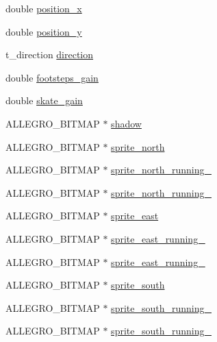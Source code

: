 \begin{DoxyCompactItemize}
\item 
double \hyperlink{classc__character_a09bb0a2dd9eb4a0c7e791706fe51bddc}{position\-\_\-x}
\item 
double \hyperlink{classc__character_a9d37196174588bc6ee1593a2f6c98244}{position\-\_\-y}
\item 
t\-\_\-direction \hyperlink{classc__character_a571f1ae6115d7e9fee3159c41fcf27e8}{direction}
\item 
double \hyperlink{classc__character_a4b50e02f88351baf6dc1542ef97fd413}{footsteps\-\_\-gain}
\item 
double \hyperlink{classc__character_addf8133a5a8cf4ce83405e5a1335fdfd}{skate\-\_\-gain}
\item 
A\-L\-L\-E\-G\-R\-O\-\_\-\-B\-I\-T\-M\-A\-P $\ast$ \hyperlink{classc__character_a7bddca76d4c38008b127fa0d3ea36738}{shadow}
\item 
A\-L\-L\-E\-G\-R\-O\-\_\-\-B\-I\-T\-M\-A\-P $\ast$ \hyperlink{classc__character_a97b679f81ebff4c53933a278a05a11c6}{sprite\-\_\-north}
\item 
A\-L\-L\-E\-G\-R\-O\-\_\-\-B\-I\-T\-M\-A\-P $\ast$ \hyperlink{classc__character_adb3cfdb7715791d21a0ac917b4443b47}{sprite\-\_\-north\-\_\-running\-\_}
\item 
A\-L\-L\-E\-G\-R\-O\-\_\-\-B\-I\-T\-M\-A\-P $\ast$ \hyperlink{classc__character_a009fa720b3902c4517edea6e1195daf5}{sprite\-\_\-north\-\_\-running\-\_}
\item 
A\-L\-L\-E\-G\-R\-O\-\_\-\-B\-I\-T\-M\-A\-P $\ast$ \hyperlink{classc__character_afabf5a5d776707387be05162e7389aa1}{sprite\-\_\-east}
\item 
A\-L\-L\-E\-G\-R\-O\-\_\-\-B\-I\-T\-M\-A\-P $\ast$ \hyperlink{classc__character_ae6f68b43b39ceac377631aa406b43a0b}{sprite\-\_\-east\-\_\-running\-\_}
\item 
A\-L\-L\-E\-G\-R\-O\-\_\-\-B\-I\-T\-M\-A\-P $\ast$ \hyperlink{classc__character_a563e59c84f1cf673bcd1d4b5179727c1}{sprite\-\_\-east\-\_\-running\-\_}
\item 
A\-L\-L\-E\-G\-R\-O\-\_\-\-B\-I\-T\-M\-A\-P $\ast$ \hyperlink{classc__character_a3ca4db7645eb80c31738f5c5dae337a9}{sprite\-\_\-south}
\item 
A\-L\-L\-E\-G\-R\-O\-\_\-\-B\-I\-T\-M\-A\-P $\ast$ \hyperlink{classc__character_af5df98de273f4561fcdc2a51f209ffec}{sprite\-\_\-south\-\_\-running\-\_}
\item 
A\-L\-L\-E\-G\-R\-O\-\_\-\-B\-I\-T\-M\-A\-P $\ast$ \hyperlink{classc__character_a5d3bd19c0e6ebe9e6bf656c33ace7577}{sprite\-\_\-south\-\_\-running\-\_}

\end{DoxyCompactItemize}

